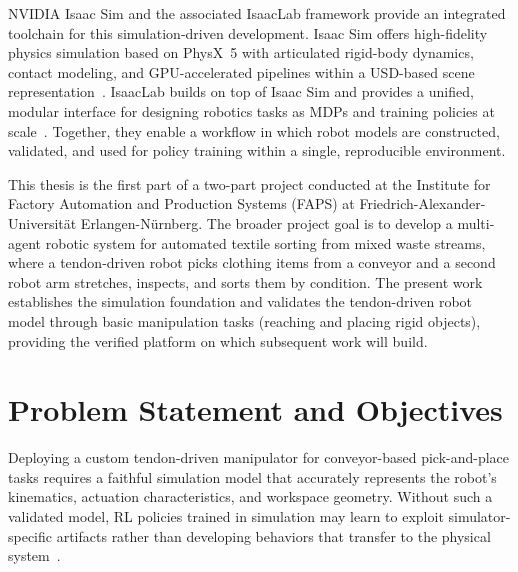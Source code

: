 NVIDIA Isaac Sim and the associated IsaacLab framework provide an integrated toolchain for this simulation-driven development. Isaac Sim offers high-fidelity physics simulation based on PhysX~5 with articulated rigid-body dynamics, contact modeling, and \ac{GPU}-accelerated pipelines within a \ac{USD}-based scene representation~\cite{nvidia_isaac_sim_510_what_is}. IsaacLab builds on top of Isaac Sim and provides a unified, modular interface for designing robotics tasks as \acp{MDP} and training policies at scale~\cite{Mittal2025IsaacLab}. Together, they enable a workflow in which robot models are constructed, validated, and used for policy training within a single, reproducible environment.

This thesis is the first part of a two-part project conducted at the Institute for Factory Automation and Production Systems (FAPS) at Friedrich-Alexander-Universität Erlangen-Nürnberg. The broader project goal is to develop a multi-agent robotic system for automated textile sorting from mixed waste streams, where a tendon-driven robot picks clothing items from a conveyor and a second robot arm stretches, inspects, and sorts them by condition. The present work establishes the simulation foundation and validates the tendon-driven robot model through basic manipulation tasks (reaching and placing rigid objects), providing the verified platform on which subsequent work will build.

\section{Problem Statement and Objectives}

Deploying a custom tendon-driven manipulator for conveyor-based pick-and-place tasks requires a faithful simulation model that accurately represents the robot's kinematics, actuation characteristics, and workspace geometry. Without such a validated model, \ac{RL} policies trained in simulation may learn to exploit simulator-specific artifacts rather than developing behaviors that transfer to the physical system~\cite{Salvato2021RealityGapSurvey,Peng2018DynamicsRandomization}.

